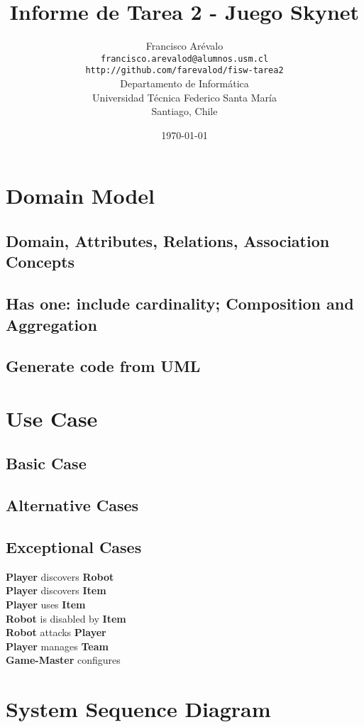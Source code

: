\documentclass{article}
\begin{document}
\title{Informe de Tarea 2 - Juego Skynet}
\author{Francisco Ar\'evalo\\
  \texttt{francisco.arevalod@alumnos.usm.cl}\\
  \texttt{http://github.com/farevalod/fisw-tarea2}\\
  \vspace{10mm}
  Departamento de Inform\'atica\\
  Universidad T\'ecnica Federico Santa Mar\'ia\\
  Santiago, Chile}
\date{\today}
\maketitle
\tableofcontents
\section{Domain Model}
\subsection{Domain, Attributes, Relations, Association Concepts}
\subsection{Has one: include cardinality; Composition and Aggregation}
\subsection{Generate code from UML}
\section{Use Case}
\subsection{Basic Case}
\subsection{Alternative Cases}
\subsection{Exceptional Cases}
\textbf{Player} discovers \textbf{Robot}\\
\textbf{Player} discovers \textbf{Item}\\
\textbf{Player} uses \textbf{Item}\\
\textbf{Robot} is disabled by \textbf{Item}\\
\textbf{Robot} attacks \textbf{Player}\\
\textbf{Player} manages \textbf{Team}\\
\textbf{Game-Master} configures\\
\section{System Sequence Diagram}
\end{document}
